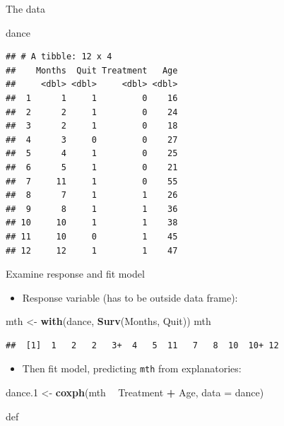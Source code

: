 \documentclass[ignorenonframetext,]{beamer}
\newenvironment{Shaded}{\begin{snugshade}}{\end{snugshade}}
\newcommand{\DataTypeTok}[1]{\textcolor[rgb]{0.13,0.29,0.53}{#1}}
\newcommand{\FloatTok}[1]{\textcolor[rgb]{0.00,0.00,0.81}{#1}}
\newcommand{\KeywordTok}[1]{\textcolor[rgb]{0.13,0.29,0.53}{\textbf{#1}}}
\newcommand{\NormalTok}[1]{#1}
\newcommand{\OperatorTok}[1]{\textcolor[rgb]{0.81,0.36,0.00}{\textbf{#1}}}
\newcommand{\StringTok}[1]{\textcolor[rgb]{0.31,0.60,0.02}{#1}}
\providecommand{\tightlist}{%
  \setlength{\itemsep}{0pt}\setlength{\parskip}{0pt}}
\begin{document}
\begin{frame}[fragile]{The data}
\protect\hypertarget{the-data-5}{}

\begin{Shaded}
\begin{Highlighting}[]
\NormalTok{dance}
\end{Highlighting}
\end{Shaded}

\begin{verbatim}
## # A tibble: 12 x 4
##    Months  Quit Treatment   Age
##     <dbl> <dbl>     <dbl> <dbl>
##  1      1     1         0    16
##  2      2     1         0    24
##  3      2     1         0    18
##  4      3     0         0    27
##  5      4     1         0    25
##  6      5     1         0    21
##  7     11     1         0    55
##  8      7     1         1    26
##  9      8     1         1    36
## 10     10     1         1    38
## 11     10     0         1    45
## 12     12     1         1    47
\end{verbatim}

\end{frame}

\begin{frame}[fragile]{Examine response and fit model}
\protect\hypertarget{examine-response-and-fit-model}{}

\begin{itemize}
\tightlist
\item
  Response variable (has to be outside data frame):
\end{itemize}

\begin{Shaded}
\begin{Highlighting}[]
\NormalTok{mth <-}\StringTok{ }\KeywordTok{with}\NormalTok{(dance, }\KeywordTok{Surv}\NormalTok{(Months, Quit))}
\NormalTok{mth}
\end{Highlighting}
\end{Shaded}

\begin{verbatim}
##  [1]  1   2   2   3+  4   5  11   7   8  10  10+ 12
\end{verbatim}

\begin{itemize}
\tightlist
\item
  Then fit model, predicting \texttt{mth} from explanatories:
\end{itemize}

\begin{Shaded}
\begin{Highlighting}[]
\NormalTok{dance}\FloatTok{.1}\NormalTok{ <-}\StringTok{ }\KeywordTok{coxph}\NormalTok{(mth }\OperatorTok{~}\StringTok{ }\NormalTok{Treatment }\OperatorTok{+}\StringTok{ }\NormalTok{Age, }\DataTypeTok{data =}\NormalTok{ dance)}
\end{Highlighting}
\end{Shaded}

def

\end{frame}
\end{document}
